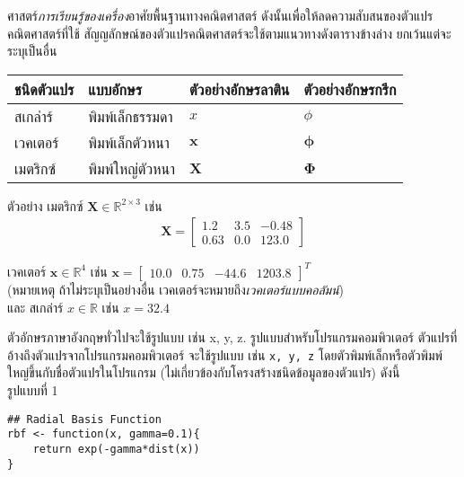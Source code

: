 ศาสตร์\textit{การเรียนรู้ของเครื่อง}อาศัยพื้นฐานทางคณิตศาสตร์ 
ดังนั้นเพื่อให้ลดความสับสนของตัวแปรคณิตศาสตร์ที่ใช้ 
สัญญลักษณ์ของตัวแปรคณิตศาสตร์จะใช้ตามแนวทางดังตารางข้างล่าง ยกเว้นแต่จะระบุเป็นอื่น
\\

\hspace{-0.5in}
\begin{tabular}{ |>{\arraybackslash}m{1.3in}  |>{\arraybackslash}m{1.3in} 
|>{\arraybackslash}m{1.4in} |>{\arraybackslash}m{1.4in}|}
\hline 
ชนิดตัวแปร & แบบอักษร & ตัวอย่างอักษรลาติน & ตัวอย่างอักษรกรีก \\ 
\hline 
สเกล่าร์ & พิมพ์เล็กธรรมดา & $x$ & $\phi$ \\ 
\hline 
เวคเตอร์ & พิมพ์เล็กตัวหนา & $\mathbf{x}$ & $\bm{\phi}$ \\
\hline 
เมตริกซ์ & พิมพ์ใหญ่ตัวหนา & $\mathbf{X}$ & $\bm{\Phi}$ \\
\hline 
\end{tabular} 
\vspace{0.5cm}

ตัวอย่าง
เมตริกซ์ $\mathbf{X} \in \mathbb{R}^{2 \times 3}$ เช่น
\begin{eqnarray}
\mathbf{X} = \begin{bmatrix}
1.2 & 3.5 & -0.48 \\
0.63 & 0.0 & 123.0
\end{bmatrix}
\nonumber
\end{eqnarray}

เวคเตอร์ $\mathbf{x} \in \mathbb{R}^4$ เช่น
$\mathbf{x} = \begin{bmatrix}
10.0 & 0.75 & -44.6 & 1203.8
\end{bmatrix}^T
$\\
(หมายเหตุ ถ้าไม่ระบุเป็นอย่างอื่น เวคเตอร์จะหมายถึง\textit{เวคเตอร์แบบคอลัมน์})
\\
และ
สเกล่าร์ $x \in \mathbb{R}$ เช่น
$
x = 32.4
$

%
ตัวอักษรภาษาอังกฤษทั่วไปจะใช้รูปแบบ เช่น x, y, z.
รูปแบบสำหรับโปรแกรมคอมพิวเตอร์ ตัวแปรที่อ้างถึงตัวแปรจากโปรแกรมคอมพิวเตอร์ จะใช้รูปแบบ เช่น \verb|x, y, z| 
โดยตัวพิมพ์เล็กหรือตัวพิมพ์ใหญ่ขึ้นกับชื่อตัวแปรในโปรแกรม (ไม่เกี่ยวข้องกับโครงสร้างชนิดข้อมูลของตัวแปร) ดังนี้
\\
รูปแบบที่ 1
\begin{verbatim}
## Radial Basis Function
rbf <- function(x, gamma=0.1){
    return exp(-gamma*dist(x))
}
\end{verbatim}

